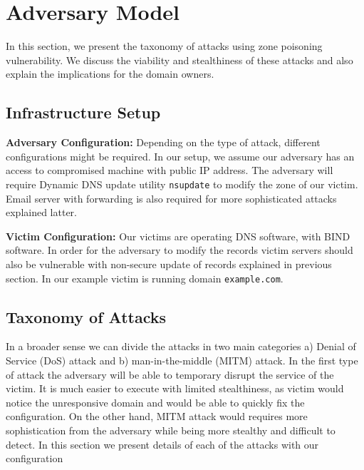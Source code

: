 \section{Adversary Model}

In this section, we present the taxonomy of attacks using zone poisoning vulnerability. We discuss the viability and stealthiness of these attacks and also explain the implications for the domain owners.

\subsection{Infrastructure Setup}


\textbf{Adversary Configuration:} Depending on the type of attack, different configurations might be required. In our setup, we assume our adversary has an access to compromised machine with public IP address. The adversary will require Dynamic DNS update utility \texttt{nsupdate} to modify the zone of our victim. Email server with forwarding is also required for more sophisticated attacks explained latter. 

\textbf{Victim Configuration:} Our victims are operating  DNS software, with BIND software. In order for the adversary to modify the records victim servers should also be vulnerable with non-secure update of records explained in previous section. In our example victim is running domain \texttt{example.com}. 


\subsection{Taxonomy of Attacks}

In a broader sense we can divide the attacks in two main categories a) Denial of Service (DoS) attack and b) man-in-the-middle (MITM) attack. In the first type of attack the adversary will be able to temporary disrupt the service of the victim. It is much easier to execute with limited stealthiness, as victim would notice the unresponsive domain and would be able to quickly fix the configuration. On the other hand, MITM attack would requires more sophistication from the adversary while being more stealthy and difficult to detect. In this section we present details of each of the attacks with our configuration 

